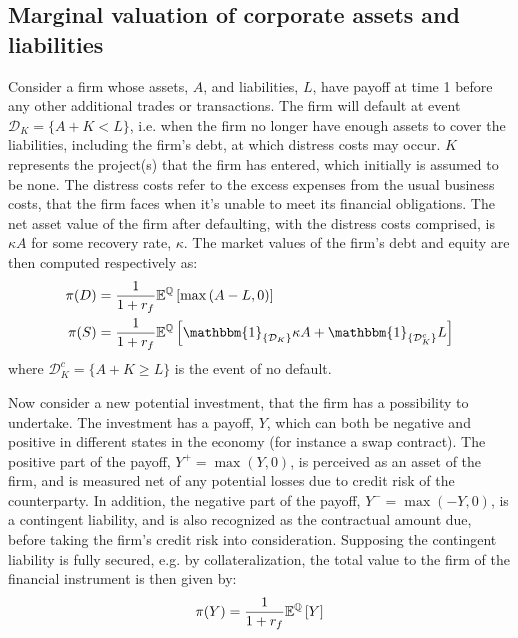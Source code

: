 \documentclass[../main.tex]{subfiles}
\begin{document}
    \subsection{Marginal valuation of corporate assets and liabilities}
        Consider a firm whose assets, $A$, and liabilities, $L$, have payoff at time 1 before any other additional trades or transactions.        
        The firm will default at event $\mathcal{D}_K=\{A + K<L\}$, i.e. when the firm no longer have enough assets to cover the liabilities, including the firm's debt, at which distress costs may occur.
        $K$ represents the project(s) that the firm has entered, which initially is assumed to be none.
        The distress costs refer to the excess expenses from the usual business costs, that the firm faces when it's unable to meet its financial obligations.
        The net asset value of the firm after defaulting, with the distress costs comprised, is $\kappa A$ for some recovery rate, $\kappa$.
        The market values of the firm's debt and equity are then computed respectively as:
        \begin{align}
            \pi(D) &= \discountfactor \mathbb{E}^{\mathbb{Q}}\left[\max\left(A-L,0\right)\right]\\
            \pi(S) &= \discountfactor \mathbb{E}^{\mathbb{Q}}\left[\mathbbm{1}_{\{\mathcal{D}_{K}\}}\kappa A + \mathbbm{1}_{\{\mathcal{D}_{K}^c\}}L\right]
        \end{align}
        where $\mathcal{D}_{K}^c = \{A + K \geq L\}$ is the event of no default.
        
        Now consider a new potential investment, that the firm has a possibility to undertake.
        The investment has a payoff, $Y$, which can both be negative and positive in different states in the economy (for instance a swap contract).
        The positive part of the payoff, $Y^{+}=\max\left(Y,0\right)$, is perceived as an asset of the firm, and is measured net of any potential losses due to credit risk of the counterparty.
        In addition, the negative part of the payoff, $Y^{-} = \max \left(-Y,0\right)$, is a contingent liability, and is also recognized as the contractual amount due, before taking the firm's credit risk into consideration.
        Supposing the contingent liability is fully secured, e.g. by collateralization, the total value to the firm of the financial instrument is then given by:
        \begin{equation}
            \pi(Y) = \frac{1}{1 + r_{f}} \mathbb{E}^{\mathbb{Q}} \left[Y\right]
        \end{equation}
\end{document}
